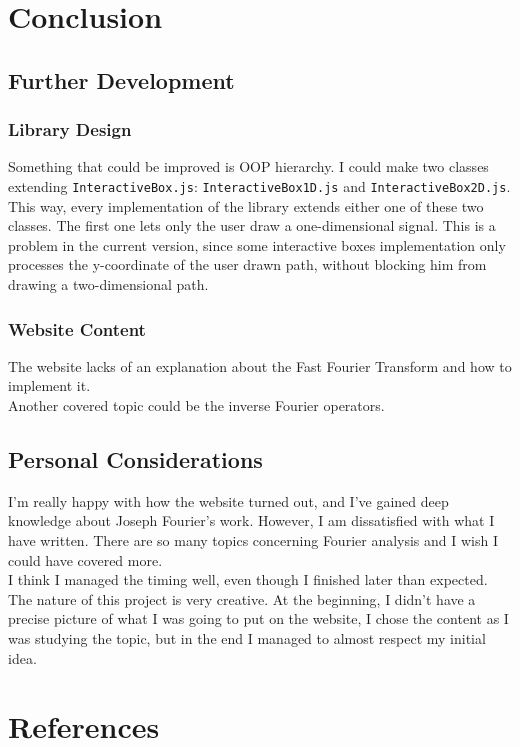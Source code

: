 \documentclass{article}
\begin{document}
\pagebreak

\section{Conclusion}

\subsection{Further Development}

\subsubsection{Library Design}

Something that could be improved is OOP hierarchy. I could make
two classes extending \texttt{InteractiveBox.js}: \texttt{InteractiveBox1D.js} and
\texttt{InteractiveBox2D.js}. This way, every implementation of the library extends either
one of these two classes. The first one lets only the user draw a one-dimensional signal.
This is a problem in the current version, since some interactive boxes implementation only processes
the y-coordinate of the user drawn path, without blocking him from drawing a two-dimensional path.

\subsubsection{Website Content}

The website lacks of an explanation about the Fast Fourier Transform and how to implement it.
\\
Another covered topic could be the inverse Fourier operators.

\subsection{Personal Considerations}

I'm really happy with how the website turned out, and I've gained deep knowledge about Joseph Fourier's work.
However, I am dissatisfied with what I have written. There are so many topics concerning Fourier analysis and I wish I could have covered more.
\\
I think I managed the timing well, even though I finished later than expected.
\\
The nature of this project is very creative. At the beginning, I didn't have a precise picture of what I was going to
put on the website, I chose the content as I was studying the topic, but in the end I managed to almost respect my initial idea.

\pagebreak

\section{References}

\nocite{*} %

\printbibliography[nottype=online, heading=subbibliography, title=Bibliography]
\printbibliography[type=online, heading=subbibliography, title=Sitography]
\end{document}
